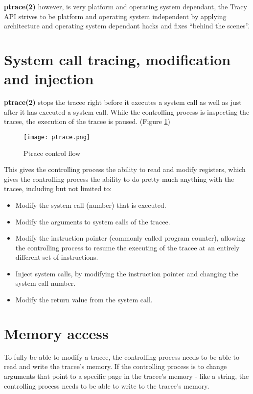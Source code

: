 \documentclass[a4paper, twoside, 10pt, twocolumn]{report}
\begin{document}
\textbf{ptrace(2)} however, is very platform and operating system dependant,
the Tracy API strives to be platform and operating system independent by
applying architecture and operating system dependant hacks and fixes
``behind the scenes''.

\section{System call tracing, modification and injection}

\textbf{ptrace(2)} stops the tracee right before it executes a system call as
well as just after it has executed a system call.
While the controlling process is inspecting the tracee, the execution of the
tracee is paused. (Figure \ref{fig1})


\begin{figure}
\label{fig1}
\texttt{[image: ptrace.png]}
\caption{Ptrace control flow}
\end{figure}

This gives the controlling process the ability to read and modify registers,
which gives the controlling process the ability to do pretty much anything
with the tracee, including but not limited to:

\begin{itemize}
\item Modify the system call (number) that is executed.
\item Modify the arguments to system calls of the tracee.
\item Modify the instruction pointer (commonly called program counter), allowing
    the controlling process to resume the executing of the tracee at an entirely
    different set of instructions.
\item Inject system calls, by modifying the instruction pointer and changing the
    system call number.
\item Modify the return value from the system call.
\end{itemize}

\section{Memory access}

To fully be able to modify a tracee, the controlling process needs to be able to
read and write the tracee's memory. If the controlling process is to change
arguments that point to a specific page in the tracee's memory - like a string,
the controlling process needs to be able to write to the tracee's memory.
\end{document}
